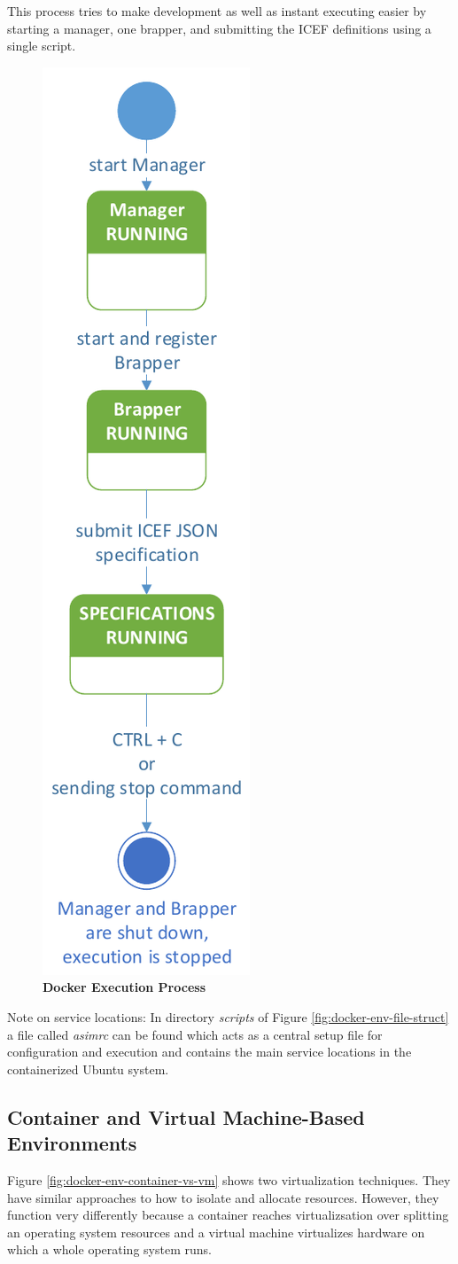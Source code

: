 This process tries to make development as well as instant executing easier by starting a manager, one brapper, and submitting the ICEF definitions using a single script.

\begin{figure}[htbp]
  \centering
  \includegraphics[height=0.9\textwidth, clip, trim=1mm 1mm 1mm 1mm]{Figures/docker_execute}
  \caption{\bf\small Docker Execution Process}
  \label{fig:docker-env-exec-process}
\end{figure}

Note on service locations: In directory \textit{scripts} of Figure \ref{fig:docker-env-file-struct} a file called \textit{asimrc} can be found which acts as a central setup file for configuration and execution and contains the main service locations in the containerized Ubuntu system.

\subsection{Container and Virtual Machine-Based Environments}
Figure \ref{fig:docker-env-container-vs-vm} shows two virtualization techniques. They have similar approaches to how to isolate and allocate resources. However, they function very differently because a container reaches virtualizsation over splitting an operating system resources and a virtual machine virtualizes hardware on which a whole operating system runs.

